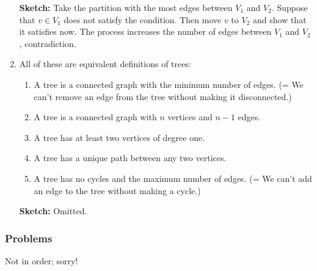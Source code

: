 \documentclass[11pt,paper=letter]{scrartcl}
\begin{document}
\begin{enumerate}
  \textbf{Sketch:} Take the partition with the most edges between $V_1$ and $V_2$. Suppose that $v \in V_1$ does not satisfy the condition. Then move $v$ to $V_2$ and show that it satisfies now. The process increases the number of edges between $V_1$ and $V_2$, contradiction.

  \item All of these are equivalent definitions of trees:
  \begin{enumerate}
    \item A tree is a connected graph with the minimum number of edges. (= We can't remove an edge from the tree without making it disconnected.)
    \item A tree is a connected graph with $n$ vertices and $n-1$ edges.
    \item A tree has at least two vertices of degree one.
    \item A tree has a unique path between any two vertices.
    \item A tree has no cycles and the maximum number of edges. (= We can't add an edge to the tree without making a cycle.)
  \end{enumerate}

  \textbf{Sketch:} Omitted.
\end{enumerate}

\subsubsection*{Problems}

Not in order; sorry!
\end{document}
